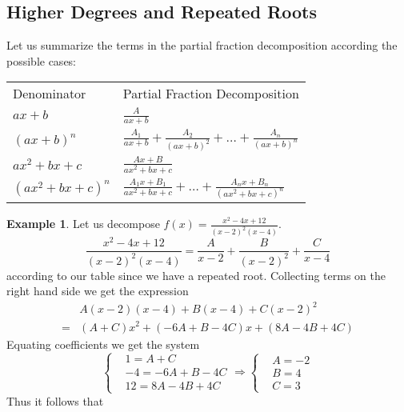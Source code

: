 \documentclass[12pt]{article}
\theoremstyle{plain}
\theoremstyle{definition}
\newtheorem{Ex}[Th]{Example}           %
\theoremstyle{remark}
\renewcommand{\:}{\colon}           %
\renewcommand{\.}{\Cdot}                %
\newcommand{\To}{\Rightarrow}
\begin{document}
\begin{multicols}{2}
\subsection*{Higher Degrees and Repeated Roots}
Let us summarize the terms in the partial fraction decomposition according the possible cases:\par
\begin{ptcb}
\begin{center}
  \begin{tabular}{l|l}
    \vspace*{1mm}Denominator & Partial Fraction Decomposition \\
    \vspace*{1mm}
    $ax+b$ & $\displaystyle\frac{A}{ax+b}$ \\
    \vspace*{1mm}
    $(ax+b)^n$ & $\displaystyle\frac{A_1}{ax+b}+\frac{A_2}{(ax+b)^2}+\dots+\frac{A_n}{(ax+b)^n}$ \\
    \vspace*{1mm}
    $ax^2+bx+c$&  $\displaystyle\frac{Ax+B}{ax^2+bx+c}$ \\
    \vspace*{1mm}
    $(ax^2+bx+c)^n$&  $\displaystyle\frac{A_1x+B_1}{ax^2+bx+c}+\dots+\frac{A_nx+B_n}{(ax^2+bx+c)^n}$
    \end{tabular}
\end{center}
\end{ptcb}
  \begin{Ex}
    Let us decompose $f(x)=\frac{x^2-4x+12}{(x-2)^2(x-4)}$.
    $$\frac{x^2-4x+12}{(x-2)^2(x-4)}=\frac{A}{x-2}+\frac{B}{(x-2)^2}+\frac{C}{x-4}$$
    according to our table since we have a repeated root. 
    Collecting terms on the right hand side we get the expression
    \begin{align*}
      &A(x-2)(x-4)+B(x-4)+C(x-2)^2\\
      =&(A+C)x^2+(-6A+B-4C)x+(8A-4B+4C)
    \end{align*}
    Equating coefficients we get the system 
    $$
\left\lbrace
\begin{aligned}
  &1=A+C\\
  &-4=-6A+B-4C\\
  &12=8A-4B+4C
\end{aligned}
\right.\To
\left\lbrace
\begin{aligned}
  &A=-2\\
  &B=4\\
  &C=3
\end{aligned}
\right.
$$
Thus it follows that 

\end{Ex}
\end{multicols}
\end{document}
